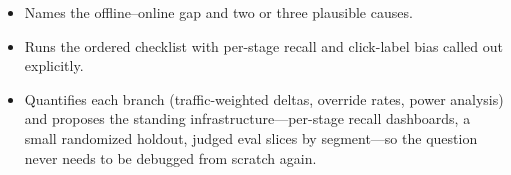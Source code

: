 \begin{interviewq}

\goodgreat
\begin{itemize}
    \item {} Names the offline--online gap and two or three plausible causes.
    \item {} Runs the ordered checklist with per-stage recall and click-label bias called out explicitly.
    \item {} Quantifies each branch (traffic-weighted deltas, override rates, power analysis) and proposes the standing infrastructure---per-stage recall dashboards, a small randomized holdout, judged eval slices by segment---so the question never needs to be debugged from scratch again.
\end{itemize}

\end{interviewq}


